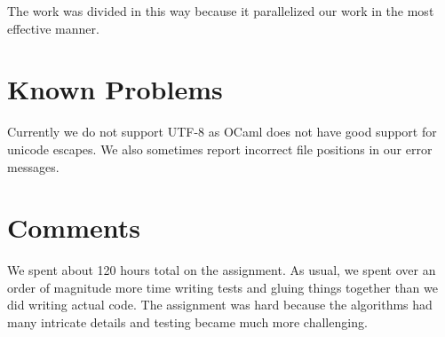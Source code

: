 \documentclass{hw}
\begin{document}
The work was divided in this way because it parallelized our work in the most
effective manner.

\section{Known Problems}\label{sec:problems}
Currently we do not support UTF-8 as OCaml does not have good support for
unicode escapes. We also sometimes report incorrect file positions in our error
messages.

\section{Comments}\label{sec:comments}
We spent about 120 hours total on the assignment. As usual, we spent over an
order of magnitude more time writing tests and gluing things together than we
did writing actual code. The assignment was hard because the algorithms had many intricate details and testing became much
more challenging.
\end{document}
